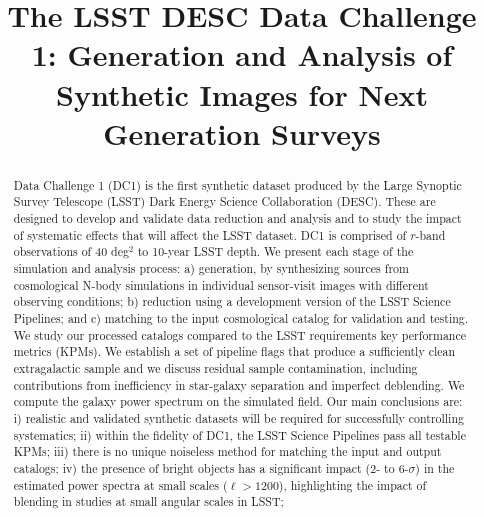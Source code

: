 \documentclass[\docopts]{\docclass}
\begin{document}
\title[LSST DESC DC1]{The LSST DESC Data Challenge 1: Generation and Analysis of Synthetic Images for Next Generation Surveys }
%
\maketitlepre

\begin{abstract}
  Data Challenge 1 (DC1) is the first synthetic
  dataset produced by the Large Synoptic Survey Telescope (LSST)
  Dark Energy Science Collaboration (DESC). These are designed to
  develop and validate data reduction and analysis
  and to study the impact of systematic effects that
  will affect the LSST dataset. DC1 is comprised of $r$-band
  observations of 40 deg$^{2}$ to 10-year LSST depth. We present
  each stage of the simulation and analysis process: a) generation, by synthesizing sources from cosmological
  N-body simulations in individual sensor-visit images with different observing conditions; b)
  reduction using a development version of the
  LSST Science Pipelines; and c) matching to the input cosmological catalog for validation and testing. We
  study our processed catalogs compared to the
  LSST requirements key performance metrics (KPMs). We establish a
  set of pipeline flags that produce a sufficiently clean extragalactic sample and
  we discuss residual sample contamination, including contributions from 
  inefficiency in star-galaxy separation and imperfect deblending. We compute the galaxy power spectrum on the simulated field. Our main
  conclusions are: i) realistic and validated synthetic datasets will
  be required for successfully controlling systematics; ii) within the fidelity of DC1,
   the LSST Science Pipelines pass all testable KPMs;
   iii) there is no unique noiseless method for matching the input and output
  catalogs; iv) the presence of bright objects has a significant
  impact (2- to 6-$\sigma$) in the estimated power spectra at small scales ($\ell > 1200$),
  highlighting the impact of blending in studies at small angular scales in LSST; 
  


\end{abstract}
\end{document}
